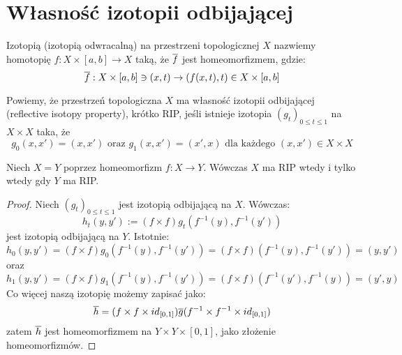 \section{Własność izotopii odbijającej}
\begin{df}
  Izotopią (izotopią odwracalną) na przestrzeni topologicznej $X$ nazwiemy homotopię $f: X \times [a, b] \rightarrow X$ taką, że $\overline{f}$ jest homeomorfizmem, gdzie:
  $$\overline{f}: X \times [a,b] \ni (x, t) \rightarrow (f(x, t), t) \in X \times [a,b]$$
\end{df}

\begin{df}
  Powiemy, że przestrzeń topologiczna $X$ ma własność izotopii odbijającej (reflective isotopy property), krótko RIP, jeśli istnieje izotopia $(g_t)_{0 \leq t \leq 1}$ na $X \times X$ taka, że
  $$g_0(x, x') = (x, x') \mbox{ oraz } g_1(x, x') = (x', x) \mbox{ dla każdego } (x, x') \in X \times X$$
\end{df}

\begin{ex}
  Niech $X = Y$ poprzez homeomorfizm $f: X \rightarrow Y$. Wówczas $X$ ma RIP wtedy i tylko wtedy gdy $Y$ ma RIP.
  \begin{proof}
    Niech $(g_t)_{0 \leq t \leq 1}$ jest izotopią odbijającą na $X$. Wówczas:
    $$h_t(y, y') := (f \times f) g_t(f^{-1}(y), f^{-1}(y'))$$
    jest izotopią odbijającą na $Y$. Istotnie:
    $$h_0(y,y') = (f \times f) g_0(f^{-1}(y), f^{-1}(y')) = (f \times f)(f^{-1}(y), f^{-1}(y')) = (y, y')$$
    oraz
    $$h_1(y,y') = (f \times f) g_1(f^{-1}(y), f^{-1}(y')) = (f \times f)(f^{-1}(y'), f^{-1}(y)) = (y', y)$$
    Co więcej naszą izotopię możemy zapisać jako:
    $$\overline{h} = (f \times f \times id_{[0,1]}) \overline{g} (f^{-1} \times f^{-1} \times id_{[0,1]})$$
    zatem $\overline{h}$ jest homeomorfizmem na $Y \times Y \times [0,1]$, jako złożenie homeomorfizmów.
  \end{proof}
\end{ex}

